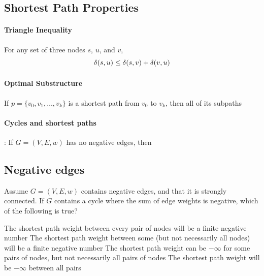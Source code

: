\documentclass[11  pt]{exam}
\begin{document}
	\newpage
	
	
	\subsection{Shortest Path Properties}
	
	\paragraph{Triangle Inequality}
	For any set of three nodes $s$, $u$, and $v$,
	\begin{equation*}
		\delta(s,u) \leq \delta(s,v) + \delta(v,u) \\
	\end{equation*}
	
	\paragraph{Optimal Substructure}
	\begin{lemma} If $p = \{v_0, v_1, \hdots , v_k\}$ is a shortest path from $v_0$ to $v_k$, then all of its subpaths 
	\end{lemma}
	
	\vs{5cm}
	
	\paragraph{Cycles and shortest paths}
	\begin{lemma}: If $G = (V,E,w)$ has no negative edges, then %
	\end{lemma}
	\vs{2cm}
	
	
	\newpage
	
	\subsection{Negative edges}
	\begin{Qu}
		Assume $G = (V,E, w)$ contains negative edges, and that it is strongly connected. If $G$ contains a cycle where the sum of edge weights is negative, which of the following is true?
		\begin{itemize}
			\aitem The shortest path weight between every pair of nodes will be a finite negative number
			\bitem The shortest path weight between some (but not necessarily all nodes) will be a finite negative number
			\citem The shortest path weight can be $-\infty$ for some pairs of nodes, but not necessarily all pairs of nodes
			\ditem The shortest path weight will be $-\infty$ between all pairs
		\end{itemize}
	\end{Qu}
	\vs{5cm}
	
\end{document}
